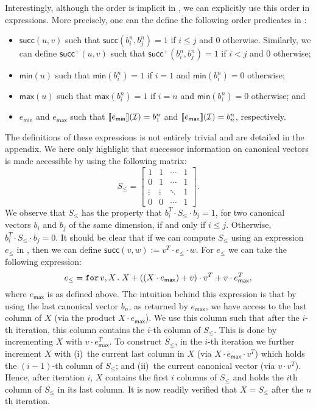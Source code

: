 Interestingly, although the order is implicit in \langfor, we can explicitly use this order in \langfor expressions. More precisely, one can the define the following order predicates in \langfor\!:
\begin{itemize}
	\item $\mathsf{succ}(u,v)$ such that $\mathsf{succ}(b_i^n,b_j^n)=1$ if $i\leq j$ and $0$ otherwise. Similarly, we can define
	$\mathsf{succ}^+(u,v)$ such that  $\mathsf{succ}^+(b_i^n,b_j^n)=1$ if $i < j$ and $0$ otherwise;
	\item $\mathsf{min}(u)$ such that  $\mathsf{min}(b_i^n)=1$ if $i=1$ and $\mathsf{min}(b_i^n)=0$ otherwise; 
	\item $\mathsf{max}(u)$ such that  $\mathsf{max}(b_i^n)=1$ if $i=n$ and $\mathsf{min}(b_i^n)=0$ otherwise; and
	\item $e_{\mathsf{min}}$ and $e_{\mathsf{max}}$ such that $\llbracket e_{\mathsf{min}} \rrbracket(\mathcal{I})=b_1^n$ and 
	$\llbracket e_{\mathsf{max}} \rrbracket(\mathcal{I})=b_n^n$, respectively.
\end{itemize}
The definitions of these expressions is not entirely trivial and are detailed in the appendix.
We here only highlight that successor information on canonical vectors is made accessible by
using the following matrix:
\[
S_{\leq} = \begin{bmatrix}
1 & 1 & \cdots &  1 \\
0 & 1 & \cdots & 1\\
\vdots & \vdots & \ddots & 1 \\
0 & 0 & \cdots & 1 
\end{bmatrix}.
\] 
We observe that $S_{\leq}$ has the property that $b_i^T\cdot S_{\leq} \cdot b_j=1$, for two canonical vectors $b_i$ and $b_j$ of the same dimension, if and only if $i\leq j$. Otherwise, $b_i^T\cdot S_{\leq} \cdot b_j=0$. It should be clear that if we can compute $S_{\leq}$ using an expression $e_{\leq}$ in \langfor, then we can define
$
\mathsf{succ}(v,w):=v^T\cdot e_{\leq} \cdot w.
$
For $e_{\leq}$ we can take the following \langfor expression:
$$
e_{\leq}=\texttt{for}\, v,X \texttt{.}\, X + \left((X\cdot e_{\mathsf{max}}) + v \right)\cdot v^T + v\cdot e^T_{\mathsf{max}},
$$
where $e_{\mathsf{max}}$ is as defined above. The intuition behind this expression is that by using the last canonical vector $b_n$, as returned by $e_{\mathsf{max}}$, we have access to the last column of $X$ (via the product $X\cdot e_{\mathsf{max}}$). We use this column such that after the $i$-th iteration, this column contains the $i$-th column of $S_{\leq}$. This is done by incrementing $X$ with $v\cdot e_{\mathsf{max}}^T$.
To construct $S_{\leq}$, in the $i$-th iteration we further increment $X$ with 
(i)~the current last column in $X$ (via $X\cdot e_{\mathsf{max}}\cdot v^T$) which holds
the $(i-1)$-th column of $S_{\leq}$; and (ii)~the current canonical vector (via $v\cdot v^T$). Hence, after iteration $i$, $X$ contains the first $i$ columns of $S_{\leq}$ and holds the $i$th column of $S_{\leq}$ in its last column. It is now readily verified that $X=S_{\leq}$ after the $n$th iteration.

